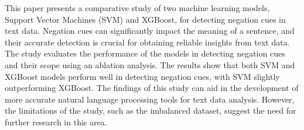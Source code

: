 
This paper presents a comparative study of two machine learning models, Support Vector Machines (SVM) and XGBoost, for detecting negation cues in text data. Negation cues can significantly impact the meaning of a sentence, and their accurate detection is crucial for obtaining reliable insights from text data. The study evaluates the performance of the models in detecting negation cues and their scope using an ablation analysis. The results show that both SVM and XGBoost models perform well in detecting negation cues, with SVM slightly outperforming XGBoost. The findings of this study can aid in the development of more accurate natural language processing tools for text data analysis. However, the limitations of the study, such as the imbalanced dataset, suggest the need for further research in this area.

